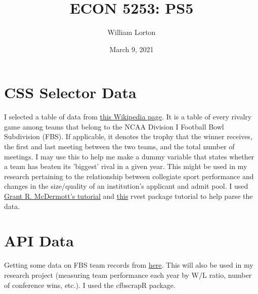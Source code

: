 \documentclass{article}
\title{ECON 5253: PS5}
\author{William Lorton}
\date{March 9, 2021}
\begin{document}
\maketitle

\section{CSS Selector Data}

I selected a table of data from \href{http://www.sharelatex.com}{this Wikipedia page}. It is a table of every rivalry game among teams that belong to the NCAA Division I Football Bowl Subdivision (FBS). If applicable, it denotes the trophy that the winner receives, the first and last meeting between the two teams, and the total number of meetings. I may use this to help me make a dummy variable that states whether a team has beaten its 'biggest' rival in a given year. This might be used in my research pertaining to the relationship between collegiate sport performance and changes in the size/quality of an institution's applicant and admit pool. I used  \href{https://raw.githack.com/uo-ec607/lectures/master/06-web-css/06-web-css.html#1}{Grant R. McDermott's tutorial} and \href{https://cran.r-project.org/web/packages/rvest/vignettes/selectorgadget.html}{this} rvest package tutorial to help parse the data.

\section{API Data}

Getting some data on FBS team records from \href{https://collegefootballdata.com/}{here}. This will also be used in my research project (measuring team performance each year by W/L ratio, number of conference wins, etc.). I used the cfbscrapR package.
\end{document}
